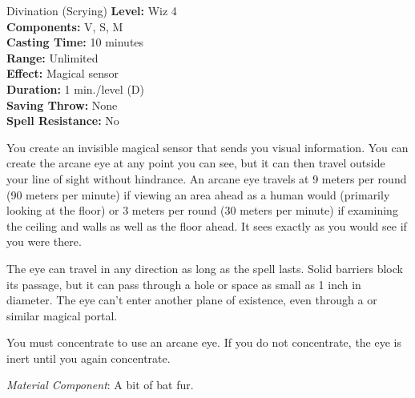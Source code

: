 {Divination (Scrying)}
{
	\textbf{Level:}
	Wiz 4\\
	\textbf{Components:}
	V, S, M\\
	\textbf{Casting Time:}
	10 minutes\\
	\textbf{Range:}
	Unlimited\\
	\textbf{Effect:}
	Magical sensor\\
	\textbf{Duration:}
	1 min./level (D)\\
	\textbf{Saving Throw:}
	None\\
	\textbf{Spell Resistance:}
	No\\
}
{
	You create an invisible magical sensor that sends you visual information. You can create the arcane eye at any point you can see, but it can then travel outside your line of sight without hindrance. An arcane eye travels at 9 meters per round (90 meters per minute) if viewing an area ahead as a human would (primarily looking at the floor) or 3 meters per round (30 meters per minute) if examining the ceiling and walls as well as the floor ahead. It sees exactly as you would see if you were there.

	The eye can travel in any direction as long as the spell lasts. Solid barriers block its passage, but it can pass through a hole or space as small as 1 inch in diameter. The eye can't enter another plane of existence, even through a  or similar magical portal.

	You must concentrate to use an arcane eye. If you do not concentrate, the eye is inert until you again concentrate.

	\textit{Material Component}:
	A bit of bat fur.

}
